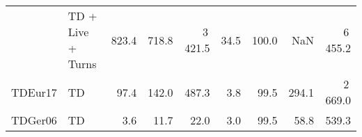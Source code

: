 \begin{tabular}{llrrrrrrr}
        & TD + Live + Turns &            823.4 &          718.8 &            3\,421.5 &      34.5 &     100.0 &                           NaN &                    6\,455.2 \\
TDEur17 & TD &             97.4 &          142.0 &             487.3 &       3.8 &      99.5 &                         294.1 &                    2\,669.0 \\
TDGer06 & TD &              3.6 &           11.7 &              22.0 &       3.0 &      99.5 &                          58.8 &                     539.3 \\
\bottomrule
\end{tabular}

